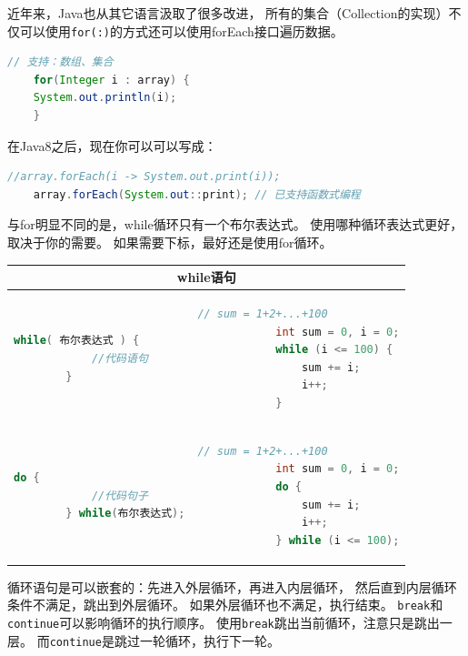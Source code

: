 近年来，Java也从其它语言汲取了很多改进，
所有的集合（Collection的实现）不仅可以使用\lstinline{for(:)}的方式还可以使用forEach接口遍历数据。
\bigskip

\begin{lstlisting}[language=Java]
	// 支持：数组、集合
	for(Integer i : array) {
    System.out.println(i);
	}
\end{lstlisting}

\noindent 在Java8之后，现在你可以可以写成：
\begin{lstlisting}[language=Java]
	//array.forEach(i -> System.out.print(i));
	array.forEach(System.out::print); // 已支持函数式编程
\end{lstlisting}
\bigskip

与for明显不同的是，while循环只有一个布尔表达式。
使用哪种循环表达式更好，取决于你的需要。
如果需要下标，最好还是使用for循环。

\begin{table}[!htbp]\centering
	\lstset{frame=none, aboveskip=0mm, belowskip=0mm}
	\begin{tabular}{|p{5cm}|p{8cm}|}
	\hline
	\multicolumn{2}{|c|}{while语句}\\
	\hline
	\begin{lstlisting}[language=Java]
		while( 布尔表达式 ) {  
			//代码语句
		}
	\end{lstlisting}
	&
	\begin{lstlisting}[language=Java]
			// sum = 1+2+...+100
			int sum = 0, i = 0;
			while (i <= 100) {
				sum += i;
				i++;
			}
	\end{lstlisting} \\
	\hline
	\begin{lstlisting}[language=Java]
		do {
			//代码句子
		} while(布尔表达式);
	\end{lstlisting}
	&
	\begin{lstlisting}[language=Java]
			// sum = 1+2+...+100
			int sum = 0, i = 0;
			do {
				sum += i;
				i++;
			} while (i <= 100);
	\end{lstlisting} \\
	\hline
	\end{tabular}
\end{table}
\noindent

循环语句是可以嵌套的：先进入外层循环，再进入内层循环，
然后直到内层循环条件不满足，跳出到外层循环。
如果外层循环也不满足，执行结束。
\lstinline{break}和\lstinline{continue}可以影响循环的执行顺序。
使用\lstinline{break}跳出当前循环，注意只是跳出一层。
而\lstinline{continue}是跳过一轮循环，执行下一轮。
\bigskip

